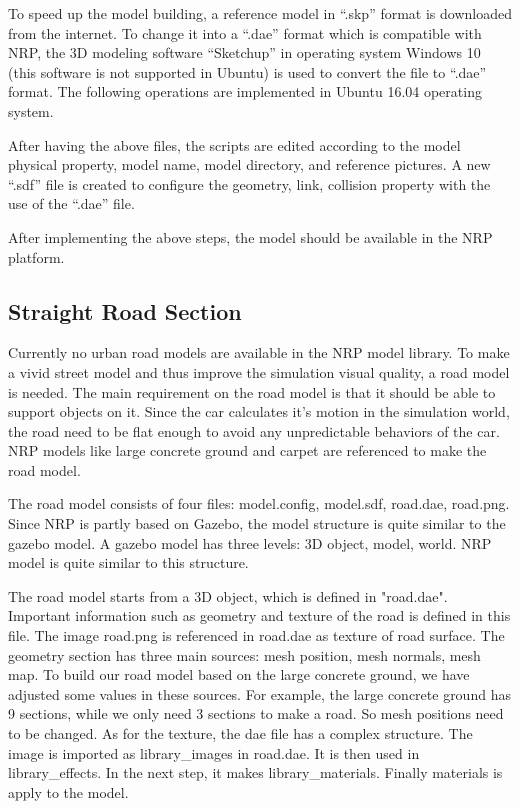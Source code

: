 To speed up the model building, a reference model in ``.skp'' format is downloaded from the internet. To change it into a ``.dae'' format which is compatible with NRP, the 3D modeling software ``Sketchup'' in operating system Windows 10 (this software is not supported in Ubuntu) is used to convert the file to ``.dae'' format. The following operations are implemented in Ubuntu 16.04 operating system. 



After having the above files, the scripts are edited according to the model physical property, model name, model directory, and reference pictures. A new ``.sdf'' file is created to configure the geometry, link, collision property with the use of the ``.dae'' file. 

After implementing the above steps, the model should be available in the NRP platform.

\subsection{Straight Road Section}

Currently no urban road models are available in the NRP model library. To make a vivid street model and thus improve the simulation visual quality, a road model is needed. The main requirement on the road model is that it should be able to support objects on it. Since the car calculates it's motion in the simulation world, the road need to be flat enough to avoid any unpredictable behaviors of the car. NRP models like large concrete ground and carpet are referenced to make the road model.


The road model consists of four files: model.config, model.sdf, road.dae, road.png. Since NRP is partly based on Gazebo, the model structure is quite similar to the gazebo model. A gazebo model has three levels: 3D object, model, world. NRP model is quite similar to this structure. 


The road model starts from a 3D object, which is defined in "road.dae". Important information such as geometry and texture of the road is defined in this file. The image road.png is referenced in road.dae as texture of road surface. The geometry section has three main sources: mesh position, mesh normals, mesh map. To build our road model based on the large concrete ground, we have adjusted some values in these sources. For example, the large concrete ground has 9 sections, while we only need 3 sections to make a road. So mesh positions need to be changed. As for the texture, the dae file has a complex structure. The image is imported as library_images in road.dae. It is then used in library_effects. In the next step, it makes library_materials. Finally materials is apply to the model. 


